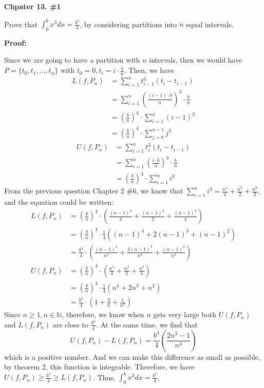 \documentclass[a4paper,12pt]{report}
\begin{document}
\noindent
\textbf{Chpater 13. \#1}

\noindent
Prove that $\int_{0}^{b}x^3dx=\frac{b^4}{4}$, by considering partitions into $n$ equal intervals. 

\noindent
\textbf{Proof: }

\noindent
Since we are going to have a partition with $n$ intervals, then we would have $P=\{t_0,t_1,...,t_n\}$ with $t_0=0, t_i=i\cdot{\frac{b}{n}}$. Then, we have
\begin{align*}
L(f,P_n)&=\sum_{i=1}^{n}t_{i-1}^{3}(t_i-t_{i-1})\\
&=\sum_{i=1}^{n}(\frac{(i-1)\cdot{b}}{n})^{3}\cdot{\frac{b}{n}}\\
&=(\frac{b}{n})^4\cdot{\sum_{i=1}^{n}(i-1)^{3}}\\
&=(\frac{b}{n})^4\cdot{\sum_{j=0}^{n-1}j^{3}}
\end{align*}
\begin{align*}
U(f,P_n)&=\sum_{i=1}^{n}t_{i}^{3}(t_i-t_{i-1})\\
&=\sum_{i=1}^{n}(\frac{i\cdot{b}}{n})^{3}\cdot{\frac{b}{n}}\\
&=(\frac{b}{n})^4\cdot{\sum_{i=1}^{n}i^{3}}
\end{align*}
From the previous question Chapter 2 \#6, we know that $\sum_{i=1}^{n}i^3=\frac{n^4}{4}+\frac{n^3}{2}+\frac{n^2}{2}$, and the equation could be written:
\begin{align*}
L(f,P_n)&=(\frac{b}{n})^4\cdot{(\frac{(n-1)^4}{4}+\frac{(n-1)^3}{2}+\frac{(n-1)^2}{4})}\\
&=(\frac{b}{n})^4\cdot{\frac{1}{4}}((n-1)^4+2(n-1)^3+(n-1)^2)\\
&=\frac{b^4}{4}\cdot{(\frac{(n-1)^4}{n^4}+\frac{2(n-1)^3}{n^4}+\frac{(n-1)^2}{n^4})}\\
U(f,P_n)&=(\frac{b}{n})^4\cdot{(\frac{n^4}{4}+\frac{n^3}{2}+\frac{n^2}{4})}\\
&=(\frac{b}{n})^4\cdot{\frac{1}{4}}(n^4+2n^3+n^2)\\
&=\frac{b^4}{4}\cdot{(1+\frac{2}{n}+\frac{1}{n^2})}
\end{align*}
Since $n\geq 1, n\in \mathbb{N}$, therefore, we know when $n$ gets very large both $U(f,P_n)$ and $L(f,P_n)$ are close to $\frac{b^4}{4}$. At the same time, we find that \[U(f,P_n)-L(f,P_n)=\frac{b^4}{4}(\frac{2n^3-1}{n^4})\] which is a positive number. And we can make this difference as small as possible, by theorem 2, this function is integrable. Therefore, we have $U(f,P_n)\geq \frac{b^4}{4} \geq L(f,P_n)$. Thus, $\int_{0}^{b}x^3dx=\frac{b^4}{4}$. \\
\end{document}

